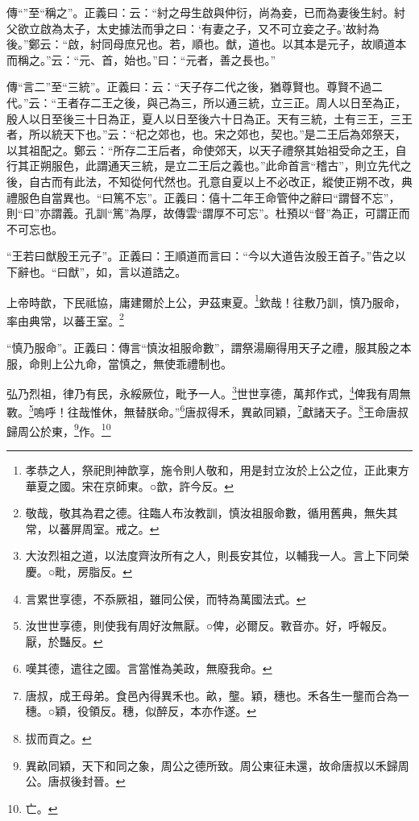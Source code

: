 {\noindent\zhuan{}\fzbyks 傳“”至“稱之”。正義曰：云：“紂之母生啟與仲衍，尚為妾，已而為妻後生紂。紂父欲立啟為太子，太史據法而爭之曰：‘有妻之子，又不可立妾之子。’故紂為後。”鄭云：“啟，紂同母庶兄也。若，順也。猷，道也。以其本是元子，故順道本而稱之。”云：“元、首，始也。”曰：“元者，善之長也。” \par}

{\noindent\zhuan{}\fzbyks 傳“言二”至“三統”。正義曰：云：“天子存二代之後，猶尊賢也。尊賢不過二代。”云：“王者存二王之後，與己為三，所以通三統，立三正。周人以日至為正，殷人以日至後三十日為正，夏人以日至後六十日為正。天有三統，土有三王，三王者，所以統天下也。”云：“杞之郊也，也。宋之郊也，契也。”是二王后為郊祭天，以其祖配之。鄭云：“所存二王后者，命使郊天，以天子禮祭其始祖受命之王，自行其正朔服色，此謂通天三統，是立二王后之義也。”此命首言“稽古”，則立先代之後，自古而有此法，不知從何代然也。孔意自夏以上不必改正，縱使正朔不改，典禮服色自當異也。“曰篤不忘”。正義曰：僖十二年王命管仲之辭曰“謂督不忘”，則“曰”亦謂義。孔訓“篤”為厚，故傳雲“謂厚不可忘”。杜預以“督”為正，可謂正而不可忘也。 \par}

{\noindent\shu{}\fzkt “王若曰猷殷王元子”。正義曰：王順道而言曰：“今以大道告汝殷王首子。”告之以下辭也。“曰猷”，如，言以道誥之。 \par}

上帝時歆，下民祗協，庸建爾於上公，尹茲東夏。\footnote{孝恭之人，祭祀則神歆享，施令則人敬和，用是封立汝於上公之位，正此東方華夏之國。宋在京師東。○歆，許今反。}欽哉！往敷乃訓，慎乃服命，率由典常，以蕃王室。\footnote{敬哉，敬其為君之德。往臨人布汝教訓，慎汝祖服命數，循用舊典，無失其常，以蕃屏周室。戒之。}

{\noindent\shu{}\fzkt “慎乃服命”。正義曰：傳言“慎汝祖服命數”，謂祭湯廟得用天子之禮，服其殷之本服，命則上公九命，當慎之，無使乖禮制也。 \par}

弘乃烈祖，律乃有民，永綏厥位，毗予一人。\footnote{大汝烈祖之道，以法度齊汝所有之人，則長安其位，以輔我一人。言上下同榮慶。○毗，房脂反。}世世享德，萬邦作式，\footnote{言累世享德，不忝厥祖，雖同公侯，而特為萬國法式。}俾我有周無斁。\footnote{汝世世享德，則使我有周好汝無厭。○俾，必爾反。斁音亦。好，呼報反。厭，於豔反。}嗚呼！往哉惟休，無替朕命。”\footnote{嘆其德，遣往之國。言當惟為美政，無廢我命。}唐叔得禾，異畝同穎，\footnote{唐叔，成王母弟。食邑內得異禾也。畝，壟。穎，穗也。禾各生一壟而合為一穗。○穎，役領反。穗，似醉反，本亦作遂。}獻諸天子。\footnote{拔而貢之。}王命唐叔歸周公於東，\footnote{異畝同穎，天下和同之象，周公之德所致。周公東征未還，故命唐叔以禾歸周公。唐叔後封晉。}作。\footnote{亡。}


